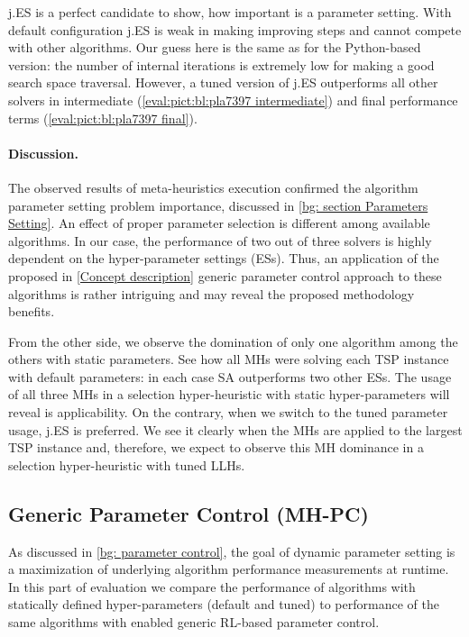 j.ES is a perfect candidate to show, how important is a parameter setting. With default configuration j.ES is weak in making improving steps and cannot compete with other algorithms. Our guess here is the same as for the Python-based version: the number of internal iterations is extremely low for making a good search space traversal. However, a tuned version of j.ES outperforms all other solvers in intermediate (\cref{eval:pict:bl:pla7397 intermediate}) and final performance terms (\cref{eval:pict:bl:pla7397 final}).


\paragraph{Discussion.} The observed results of meta-heuristics execution confirmed the algorithm parameter setting problem importance, discussed in \cref{bg: section Parameters Setting}. An effect of proper parameter selection is different among available algorithms. In our case, the performance of two out of three solvers is highly dependent on the hyper-parameter settings (ESs). Thus, an application of the proposed in \cref{Concept description} generic parameter control approach to these algorithms is rather intriguing and may reveal the proposed methodology benefits.

From the other side, we observe the domination of only one algorithm among the others with static parameters. See how all MHs were solving each TSP instance with default parameters: in each case SA outperforms two other ESs. The usage of all three MHs in a selection hyper-heuristic with static hyper-parameters will reveal is applicability. On the contrary, when we switch to the tuned parameter usage, j.ES is preferred. We see it clearly when the MHs are applied to the largest TSP instance and, therefore, we expect to observe this MH dominance in a selection hyper-heuristic with tuned LLHs.

\subsection{Generic Parameter Control (MH-PC)}\label{eval:1:PC}
As discussed in \cref{bg: parameter control}, the goal of dynamic parameter setting is a maximization of underlying algorithm performance measurements at runtime. In this part of evaluation we compare the performance of algorithms with statically defined hyper-parameters (default and tuned) to performance of the same algorithms with enabled generic RL-based parameter control.

